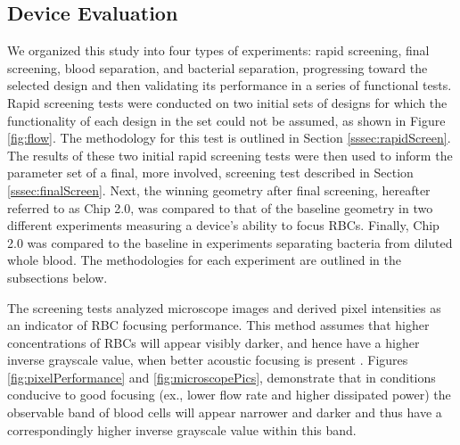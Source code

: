 \subsection{Device Evaluation}
\label{sec:eval}
We organized this study into four types of experiments: rapid screening, final screening, blood separation, and bacterial separation, progressing toward the selected design and then validating its performance in a series of functional tests. Rapid screening tests were conducted on two initial sets of designs for which the functionality of each design in the set could not be assumed, as shown in Figure \ref{fig:flow}. The methodology for this test is outlined in Section \ref{sssec:rapidScreen}. The results of these two initial rapid screening tests were then used to inform the parameter set of a final, more involved, screening test described in Section \ref{sssec:finalScreen}. Next, the winning geometry after final screening, hereafter referred to as Chip 2.0,  was compared to that of the baseline geometry in two different experiments measuring a device's ability to focus RBCs.  Finally, Chip 2.0 was compared to the baseline in experiments separating bacteria from diluted whole blood. The methodologies for each experiment are outlined in the subsections below. 

The screening tests analyzed microscope images and derived pixel intensities as an indicator of RBC focusing performance. This method assumes that higher concentrations of RBCs will appear visibly darker, and hence have a higher inverse grayscale value, when better acoustic focusing is present \cite{barnkob2012measuring}. Figures \ref{fig:pixelPerformance} and \ref{fig:microscopePics},  demonstrate that in conditions conducive to good focusing (ex., lower flow rate and higher dissipated power) the observable band of blood cells will appear narrower and darker and thus have a correspondingly higher inverse grayscale value within this band. 

